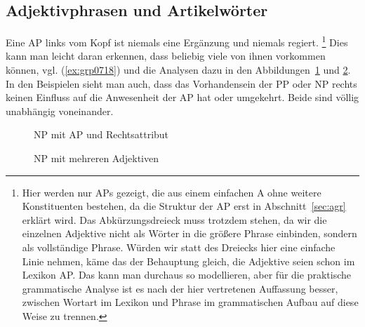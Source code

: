 \subsection{Adjektivphrasen und Artikelwörter}

\label{sec:adjektiveundartikelwoerter}

Eine AP links vom Kopf ist niemals eine Ergänzung und niemals regiert.%
\footnote{Hier werden nur APs gezeigt, die aus einem einfachen A ohne weitere Konstituenten bestehen, da die Struktur der AP erst in Abschnitt~\ref{sec:agr} erklärt wird.
Das Abkürzungsdreieck muss trotzdem stehen, da wir die einzelnen Adjektive nicht als Wörter in die größere Phrase einbinden, sondern als vollständige Phrase.
Würden wir statt des Dreiecks hier eine einfache Linie nehmen, käme das der Behauptung gleich, die Adjektive seien schon im Lexikon AP.
Das kann man durchaus so modellieren, aber für die praktische grammatische Analyse ist es nach der hier vertretenen Auffassung besser, zwischen Wortart im Lexikon und Phrase im grammatischen Aufbau auf diese Weise zu trennen.}
Dies kann man leicht daran erkennen, dass beliebig viele von ihnen vorkommen können, vgl. (\ref{ex:grp0718}) und die Analysen dazu in den Abbildungen~\ref{fig:grp0718a} und \ref{fig:grp0718b}.
In den Beispielen sieht man auch, dass das Vorhandensein der PP oder NP rechts keinen Einfluss auf die Anwesenheit der AP hat oder umgekehrt.
Beide sind völlig unabhängig voneinander.

\begin{exe}
  \ex\label{ex:grp0718}
  \begin{xlist}
  \end{xlist}
\end{exe}

\begin{figure}
  \centering
  \caption{NP mit AP und Rechtsattribut}
  \label{fig:grp0718a}
\end{figure}

\begin{figure}
  \centering
  \caption{NP mit mehreren Adjektiven}
  \label{fig:grp0718b}
\end{figure}

